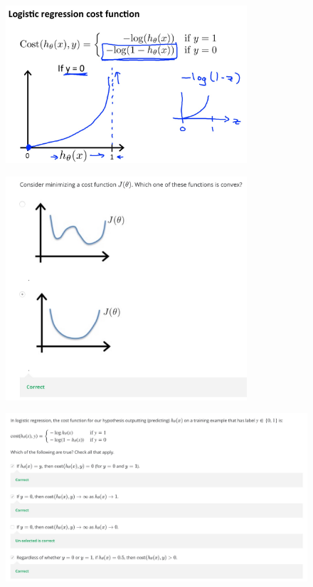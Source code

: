 \documentclass[12pt, A4,onecolumn]{article} %
\begin{document}
\begin{figure}[H]
	\centering
	\includegraphics[width=0.8\textwidth]{./Imagenes/costFunc7}
\end{figure}

\begin{figure}[H]
	\centering
	\includegraphics[width=0.8\textwidth]{./Imagenes/testCostFunc1}
\end{figure}

\begin{figure}[H]
	\centering
	\includegraphics[width=1\textwidth]{./Imagenes/testCostFunc2}
\end{figure}
\end{document}
